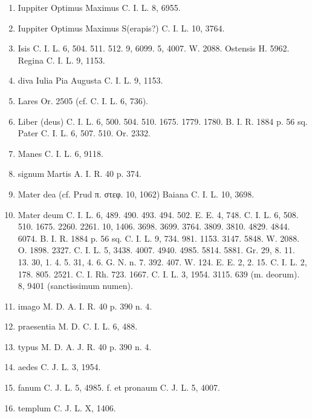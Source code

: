 \documentclass[a4paper, 11pt, oneside, polutonikogreek, german]{article}
\begin{document}
\begin{enumerate}
\item Iuppiter Optimus Maximus C. I. L. 8, 6955.

\item Iuppiter Optimus Maximus S(erapis?) C. I. L. 10, 3764.

\item Isis C. I. L. 6, 504. 511. 512. 9, 6099. 5, 4007. W. 2088. Ostensis H. 5962. Regina C. I. L. 9, 1153.

\item diva Iulia Pia Augusta C. I. L. 9, 1153.

\item Lares Or. 2505 (cf. C. I. L. 6, 736).

\item Liber (deus) C. I. L. 6, 500. 504. 510. 1675. 1779. 1780. B. I. R. 1884 p. 56 sq. Pater C. I. L. 6, 507. 510. Or. 2332.

\item Manes C. I. L. 6, 9118.

\item signum Martis A. I. R. 40 p. 374.

\item Mater dea (cf. Prud π. στεφ. 10, 1062) Baiana C. I. L. 10, 3698.

\item Mater deum C. I. L. 6, 489. 490. 493. 494. 502. E. E. 4, 748. C. I. L. 6, 508. 510. 1675. 2260. 2261. 10, 1406. 3698. 3699. 3764. 3809. 3810. 4829. 4844. 6074. B. I. R. 1884 p. 56 sq. C. I. L. 9, 734. 981. 1153. 3147. 5848. W. 2088. O. 1898. 2327. C. I. L. 5, 3438. 4007. 4940. 4985. 5814. 5881. Gr. 29, 8. 11. 13. 30, 1. 4. 5. 31, 4. 6. G. N. n. 7. 392. 407. W. 124. E. E. 2, 2. 15. C. I. L. 2, 178. 805. 2521. C. I. Rh. 723. 1667. C. I. L. 3, 1954. 3115. 639 (m. deorum). 8, 9401 (sanctissimum numen).

\item imago M. D. A. I. R. 40 p. 390 n. 4.

\item praesentia M. D. C. I. L. 6, 488.

\item typus M. D. A. J. R. 40 p. 390 n. 4.

\item aedes C. J. L. 3, 1954.

\item fanum C. J. L. 5, 4985. f. et pronaum C. J. L. 5, 4007.

\item templum C. J. L. X, 1406.


\end{enumerate}
\end{document}
